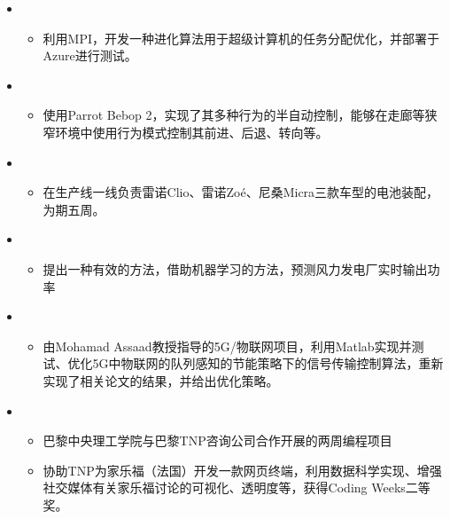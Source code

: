 	\begin{itemize}[leftmargin=*,itemsep= 0 pt,topsep = 1.2 pt, parsep = 0.5 pt]
		\item
			{\small
			\begin{itemize}
				\item{利用MPI，开发一种进化算法用于超级计算机的任务分配优化，并部署于Azure进行测试。}
			\end{itemize}
			}
		\item
			{\small
			\begin{itemize}
				\item 使用Parrot Bebop 2，实现了其多种行为的半自动控制，能够在走廊等狭窄环境中使用行为模式控制其前进、后退、转向等。
			\end{itemize}
			}
		\item
			{\small
			\begin{itemize}
				\item 在生产线一线负责雷诺Clio、雷诺Zoé、尼桑Micra三款车型的电池装配，为期五周。
			\end{itemize}
			}
		\item
			{\small
			\begin{itemize}
				\item 提出一种有效的方法，借助机器学习的方法，预测风力发电厂实时输出功率
			\end{itemize}
			}
		\item
			{\small
			\begin{itemize}
				\item 由Mohamad Assaad教授指导的5G/物联网项目，利用Matlab实现并测试、优化5G中物联网的队列感知的节能策略下的信号传输控制算法，重新实现了相关论文的结果，并给出优化策略。
			\end{itemize}
			}
		\item
			{\small
			\begin{itemize}
				\item 巴黎中央理工学院与巴黎TNP咨询公司合作开展的两周编程项目
				\item 协助TNP为家乐福（法国）开发一款网页终端，利用数据科学实现、增强社交媒体有关家乐福讨论的可视化、透明度等，获得Coding Weeks二等奖。
			\end{itemize}
			}
	\end{itemize}